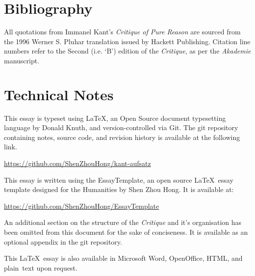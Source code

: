 \section{Bibliography}
All quotations from Immanel Kant's \emph{Critique of Pure Reason} are sourced from the 1996 Werner S. Pluhar translation issued by Hackett Publishing. Citation line numbers refer to the Second (i.e. `B') edition of the \emph{Critique}, as per the \emph{Akademie} manuscript.
\nocite{*}
\printbibliography[heading=none]

\section*{Technical Notes}
This essay is typeset using \LaTeX, an Open Source document typesetting language
by Donald Knuth, and version-controlled via Git. The git repository containing notes, source code, and revision history is available at the following link.

\url{https://github.com/ShenZhouHong/kant-aufsatz}

\noindent
This essay is written using the EssayTemplate, an open source \LaTeX\ essay
template designed for the Humanities by Shen Zhou Hong. It is available at:

\url{https://github.com/ShenZhouHong/EssayTemplate}

\noindent
An additional section on the structure of the \emph{Critique} and it's organisation has been omitted from this document for the sake of conciseness. It is available as an optional appendix in the git repository.

\vfill
\begin{center}
This \LaTeX\ essay is also available in Microsoft Word, OpenOffice, HTML, and \mbox{plain text} upon request.
\end{center}
